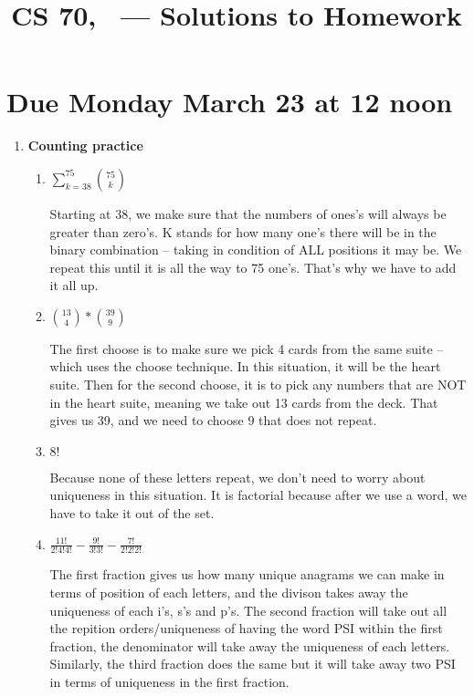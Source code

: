\documentclass[12pt,fleqn]{article}
\title{CS 70, \Session\ --- Solutions to Homework \Homework}
\date{}
\begin{document}
\maketitle

\section*{Due Monday March 23 at 12 noon}



\begin{enumerate}
  \item \textbf{Counting practice}
  
  
  \begin{enumerate}
    \item 
    $\sum_{k = 38}^{75} {75 \choose k}$
    
    Starting at 38, we make sure that the numbers of ones's will always be greater than zero's. K stands for how many one's there will be in the binary combination -- taking in condition of ALL positions it may be. We repeat this until it is all the way to 75 one's. That's why we have to add it all up.
    
    \item 
    ${13 \choose 4} * {39 \choose 9}$
    
    The first choose is to make sure we pick 4 cards from the same suite -- which uses the choose technique. In this situation, it will be the heart suite. Then for the second choose, it is to pick any numbers that are NOT in the heart suite, meaning we take out 13 cards from the deck. That gives us 39, and we need to choose 9 that does not repeat. 
    
    \item 
    $8!$
    
    Because none of these letters repeat, we don't need to worry about uniqueness in this situation. It is factorial because after we use a word, we have to take it out of the set. 

    \item 
    $\frac{11!}{2!4!4!} - \frac{9!}{3!3!} - \frac{7!}{2!2!2!}$
    
    The first fraction gives us how many unique anagrams we can make in terms of position of each letters, and the divison takes away the uniqueness of each i's, s's and p's. The second fraction will take out all the repition orders/uniqueness of having the word PSI within the first fraction, the denominator will take away the uniqueness of each letters. Similarly, the third fraction does the same but it will take away two PSI in terms of uniqueness in the first fraction. 
    

\end{enumerate}
\end{enumerate}
\end{document}
